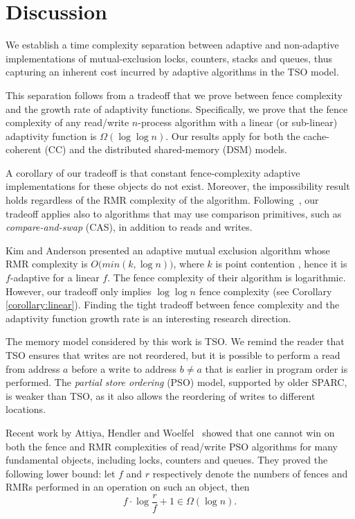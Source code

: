 \section{Discussion}
\label{sec:discussion}

We establish a time complexity separation between adaptive and non-adaptive implementations of mutual-exclusion locks, counters, stacks and queues, thus capturing an inherent cost incurred by adaptive algorithms in the TSO model.

This separation follows from a tradeoff that we prove between fence complexity and the growth rate of adaptivity functions. Specifically, we prove that the fence complexity of any read/write $n$-process algorithm with a linear (or sub-linear) adaptivity function is $\Omega(\log \log n)$. Our results apply for both the cache-coherent (CC) and the distributed shared-memory (DSM) models.

A corollary of our tradeoff is that constant fence-complexity adaptive implementations for these objects do not exist. Moreover,  the impossibility result holds regardless of the RMR complexity of the algorithm.
Following~\cite{DBLP:conf/podc/AttiyaHL13,DBLP:journals/dc/GolabHHW12},
our tradeoff applies also to algorithms that may use
comparison primitives, such as \emph{compare-and-swap} (CAS),
in addition to reads and writes.

Kim and Anderson presented an adaptive mutual exclusion algorithm whose RMR complexity is $O\big(min(k,\log n)\big)$, where $k$ is point contention \cite{DBLP:journals/dc/KimA07}, hence it is $f$-adaptive for a linear $f$. The fence complexity of their algorithm is logarithmic. However, our tradeoff only implies $\log \log n$ fence complexity (see Corollary \ref{corollary:linear}). Finding the tight tradeoff between fence complexity and the adaptivity function growth rate is an interesting research direction.

The memory model considered by this work is TSO. We remind the reader that TSO ensures that writes are not reordered, but it is possible to perform a read from address $a$ before a write to address $b \neq a$ that is earlier in program order is performed.
The \emph{partial store ordering} (PSO) model, supported by older SPARC, is weaker than TSO, as it also allows the reordering of writes to different locations. 

Recent work by Attiya, Hendler and Woelfel~\cite{PSOLowerBound} showed that one cannot win on both the fence and RMR complexities of read/write PSO algorithms for many fundamental objects,
including locks, counters and queues. They proved the following lower bound: let $f$ and $r$ respectively denote the numbers of fences and RMRs performed in an operation on such an object, then
\begin{equation}\label{equation:X}
  f \cdot \log \frac{r}{f} + 1\in \Omega(\log n).
\end{equation} 

